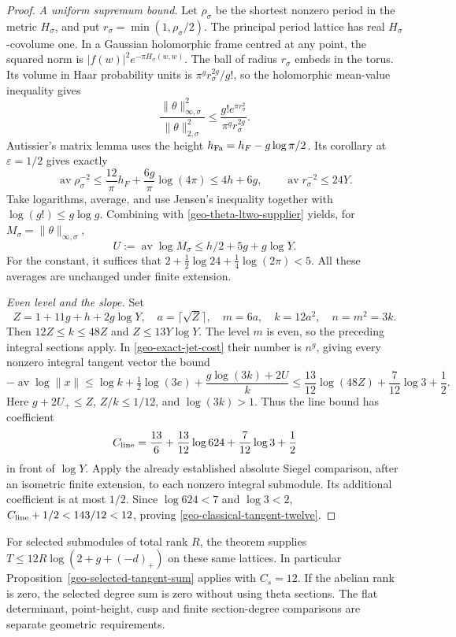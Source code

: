 \begin{proof}
\emph{A uniform supremum bound.}
Let $\rho_\sigma$ be the shortest nonzero period in the metric
$H_\sigma$, and put $r_\sigma=\min(1,\rho_\sigma/2)$.
The principal period lattice has real $H_\sigma$-covolume one.
In a Gaussian holomorphic frame centred at any point, the squared
norm is $|f(w)|^2e^{-\pi H_\sigma(w,w)}$. The ball of radius
$r_\sigma$ embeds in the torus. Its volume in Haar probability units
is $\pi^g r_\sigma^{2g}/g!$, so the holomorphic mean-value inequality gives
\[
 \frac{\|\theta\|_{\infty,\sigma}^2}{\|\theta\|_{2,\sigma}^2}
       \le\frac{g!e^{\pi r_\sigma^2}}{\pi^g r_\sigma^{2g}}.
\]
Autissier's matrix lemma uses the height
$h_{\rm Fa}=h_F-g\log\pi/2$. Its corollary at $\varepsilon=1/2$
gives exactly
\cite[Corollary~1.4 and the height convention in Section~2]{autissier-matrix}
\[
 \operatorname{av}\rho_\sigma^{-2}
 \le\frac{12}{\pi}h_F+\frac{6g}{\pi}\log(4\pi)
 \le4h+6g,\qquad
 \operatorname{av}r_\sigma^{-2}\le24Y.
\]
Take logarithms, average, and use Jensen's inequality together with
$\log(g!)\le g\log g$. Combining with
\eqref{geo-theta-ltwo-supplier} yields, for
$M_\sigma=\|\theta\|_{\infty,\sigma}$,
\begin{equation}\label{geo-theta-sup-supplier}
 U:=\operatorname{av}\log M_\sigma
                 \le h/2+5g+g\log Y.
\end{equation}
For the constant, it suffices that
$2+\tfrac12\log24+\tfrac14\log(2\pi)<5$.
All these averages are unchanged under finite extension.

\emph{Even level and the slope.}
Set
\[
 Z=1+11g+h+2g\log Y,\quad a=\lceil\sqrt Z\rceil,
 \quad m=6a,\quad k=12a^2,\quad n=m^2=3k.
\]
Then $12Z\le k\le48Z$ and $Z\le13Y\log Y$. The level $m$
is even, so the preceding integral sections apply. In
\eqref{geo-exact-jet-cost} their number is $n^g$, giving every
nonzero integral tangent vector the bound
\[
 -\operatorname{av}\log\|x\|
 \le\log k+\tfrac12\log(3e)+\frac{g\log(3k)+2U}{k}
 \le\frac{13}{12}\log(48Z)+\frac7{12}\log3+\frac12.
\]
Here $g+2U_+\le Z$, $Z/k\le1/12$, and $\log(3k)>1$.
Thus the line bound has coefficient
\[
 C_{\rm line}=\frac{13}{6}+\frac{13}{12}\log624
                              +\frac7{12}\log3+\frac12
\]
in front of $\log Y$. Apply the already established absolute Siegel
comparison, after an isometric finite extension, to each nonzero
integral submodule. Its additional coefficient is at most $1/2$.
Since $\log624<7$ and $\log3<2$,
$C_{\rm line}+1/2<143/12<12$, proving
\eqref{geo-classical-tangent-twelve}.
\end{proof}

For selected submodules of total rank $R$, the theorem supplies
$T\le12R\log(2+g+(-d)_+)$ on these same lattices. In particular
Proposition~\ref{geo-selected-tangent-sum} applies with $C_s=12$.
If the abelian rank is zero, the selected degree sum is zero without
using theta sections. The flat determinant, point-height, cusp and
finite section-degree comparisons are separate geometric requirements.
